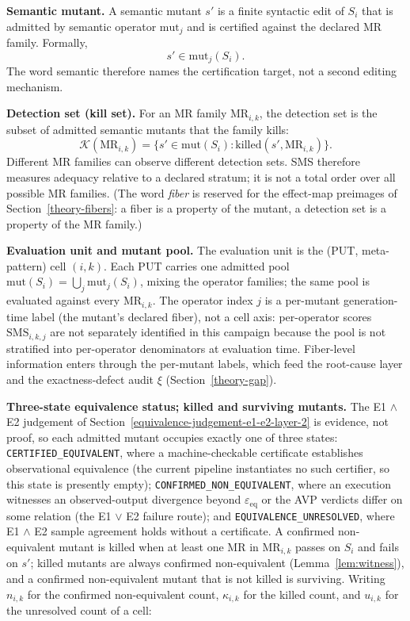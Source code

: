 \documentclass[review,12pt,authoryear]{elsarticle}
\begin{document}
\textbf{Semantic mutant.} A semantic mutant \(s'\) is a finite syntactic
edit of \(S_i\) that is admitted by semantic operator \(\mathrm{mut}_j\)
and is certified against the declared MR family. Formally,
\[
  s' \in \mathrm{mut}_j(S_i).
\]
The word semantic therefore names the certification target, not a second
editing mechanism.

\textbf{Detection set (kill set).} For an MR family \(\mathrm{MR}_{i,k}\),
the detection set is the subset of admitted semantic mutants
that the family kills:
\[
  \mathcal{K}(\mathrm{MR}_{i,k}) =
  \{s' \in \mathrm{mut}(S_i): \mathrm{killed}(s', \mathrm{MR}_{i,k})\}.
\]
Different MR families can observe different detection sets. SMS therefore
measures adequacy relative to a declared stratum; it is not a total order
over all possible MR families. (The word \emph{fiber} is reserved for
the effect-map preimages of Section~\ref{theory-fibers}: a fiber is a
property of the mutant, a detection set is a property of the MR family.)

\textbf{Evaluation unit and mutant pool.} The evaluation unit is the
(PUT, meta-pattern) cell \((i,k)\). Each PUT carries one admitted pool
\(\mathrm{mut}(S_i) = \bigcup_j \mathrm{mut}_j(S_i)\), mixing the
operator families; the same pool is evaluated against every
\(\mathrm{MR}_{i,k}\). The operator index \(j\) is a per-mutant
generation-time label (the mutant's declared fiber), not a cell axis:
per-operator scores \(\mathrm{SMS}_{i,k,j}\) are not separately
identified in this campaign because the pool is not stratified into
per-operator denominators at evaluation time. Fiber-level information
enters through the per-mutant labels, which feed the root-cause layer
and the exactness-defect audit \(\xi\) (Section~\ref{theory-gap}).

\textbf{Three-state equivalence status; killed and surviving mutants.}
The E1 $\wedge$ E2 judgement of Section~\ref{equivalence-judgement-e1-e2-layer-2} is evidence, not proof, so
each admitted mutant occupies exactly one of three states:
\texttt{CERTIFIED\_EQUIVALENT}, where a machine-checkable certificate
establishes observational equivalence (the current pipeline instantiates
no such certifier, so this state is presently empty);
\texttt{CONFIRMED\_NON\_EQUIVALENT}, where an execution witnesses an
observed-output divergence beyond $\varepsilon_{\mathrm{eq}}$ or the AVP
verdicts differ on some relation (the E1 $\vee$ E2 failure route); and
\texttt{EQUIVALENCE\_UNRESOLVED}, where E1 $\wedge$ E2 sample agreement
holds without a certificate. A confirmed non-equivalent mutant is killed
when at least one MR in \(\mathrm{MR}_{i,k}\) passes on \(S_i\) and
fails on \(s'\); killed mutants are always confirmed non-equivalent
(Lemma~\ref{lem:witness}), and a confirmed non-equivalent mutant that is
not killed is surviving. Writing \(n_{i,k}\) for the confirmed
non-equivalent count, \(\kappa_{i,k}\) for the killed count, and
\(u_{i,k}\) for the unresolved count of a cell:
\end{document}
